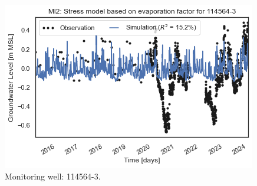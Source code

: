 \begin{figure}[htbp]
\begin{minipage}{0.32\textwidth}
        \includegraphics[width=\linewidth]{frontmatter/Rozenburg-fig/1145643.png}
        \caption{Monitoring well: 114564-3.}
        \label{fig:114564-3}
    \end{minipage}
\end{figure}

